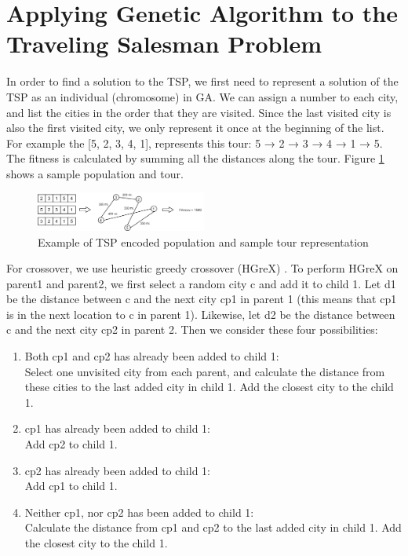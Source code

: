 \documentclass[10pt,journal,compsoc]{IEEEtran}
\begin{document}
\section{Applying Genetic Algorithm to the Traveling Salesman Problem}

In order to find a solution to the TSP, we first need to represent a solution of the TSP as an individual (chromosome) in GA. We can assign a number to each city, and list the cities in the order that they are visited. Since the last visited city is also the first visited city, we only represent it once at the beginning of the list. For example the [5, 2, 3, 4, 1], represents this tour: 5 → 2 → 3 → 4 → 1 → 5. The fitness is calculated by summing all the distances along the tour. Figure \ref{fig:2} shows a sample population and tour.\\

\begin{figure}
    \centering
    \includegraphics[width=0.5\textwidth]{png/02.png}
    \caption{Example of TSP encoded population and sample tour representation}
    \label{fig:2}
\end{figure}

For crossover, we use heuristic greedy crossover (HGreX) \cite{puljic2013comparison}. To perform HGreX on parent1 and parent2, we first select a random city c and add it to child 1. Let d1 be the distance between c and the next city cp1 in parent 1 (this means that cp1 is in the next location to c in parent 1). Likewise, let d2 be the distance between c and the next city cp2 in parent 2. Then we consider these four possibilities:
\begin{enumerate}
    \item Both cp1 and cp2 has already been added to child 1:\\
    Select one unvisited city from each parent, and calculate the distance from these cities to the last added city in child 1. Add the closest city to the child 1.
    \item cp1 has already been added to child 1:\\
    Add cp2 to child 1.
    \item cp2 has already been added to child 1:\\
    Add cp1 to child 1.
    \item Neither cp1, nor cp2 has been added to child 1:\\
    Calculate the distance from cp1 and cp2 to the last added city in child 1. Add the closest city to the child 1.
\end{enumerate}
\end{document}
